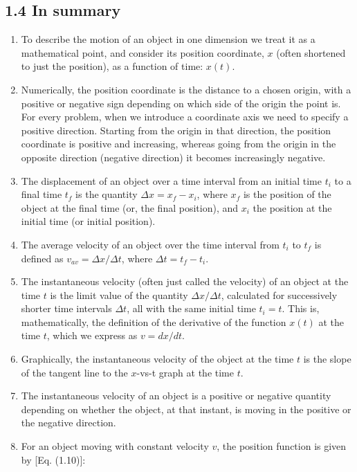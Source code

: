 \documentclass[10pt]{article}
\begin{document}
\subsection*{1.4 In summary}
\begin{enumerate}
  \item To describe the motion of an object in one dimension we treat it as a mathematical point, and consider its position coordinate, $x$ (often shortened to just the position), as a function of time: $x(t)$.
  \item Numerically, the position coordinate is the distance to a chosen origin, with a positive or negative sign depending on which side of the origin the point is. For every problem, when we introduce a coordinate axis we need to specify a positive direction. Starting from the origin in that direction, the position coordinate is positive and increasing, whereas going from the origin in the opposite direction (negative direction) it becomes increasingly negative.
  \item The displacement of an object over a time interval from an initial time $t_{i}$ to a final time $t_{f}$ is the quantity $\Delta x=x_{f}-x_{i}$, where $x_{f}$ is the position of the object at the final time (or, the final position), and $x_{i}$ the position at the initial time (or initial position).
  \item The average velocity of an object over the time interval from $t_{i}$ to $t_{f}$ is defined as $v_{a v}=\Delta x / \Delta t$, where $\Delta t=t_{f}-t_{i}$.
  \item The instantaneous velocity (often just called the velocity) of an object at the time $t$ is the limit value of the quantity $\Delta x / \Delta t$, calculated for successively shorter time intervals $\Delta t$, all with the same initial time $t_{i}=t$. This is, mathematically, the definition of the derivative of the function $x(t)$ at the time $t$, which we express as $v=d x / d t$.
  \item Graphically, the instantaneous velocity of the object at the time $t$ is the slope of the tangent line to the $x$-vs-t graph at the time $t$.
  \item The instantaneous velocity of an object is a positive or negative quantity depending on whether the object, at that instant, is moving in the positive or the negative direction.
  \item For an object moving with constant velocity $v$, the position function is given by [Eq. (1.10)]:
\end{enumerate}
\end{document}
